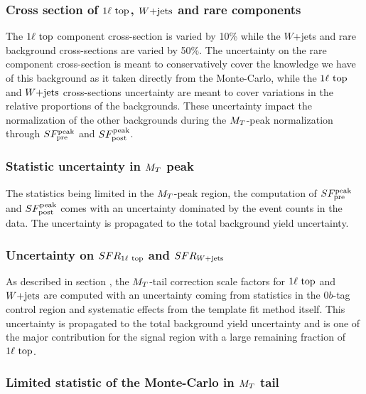             \subsubsection{Cross section of $1\ell~\text{top}$, $\text{$W$+jets}$ and rare components}
        
            The $1\ell~\text{top}$ component cross-section is varied by 10\% while the $W$+jets 
            and rare background cross-sections are varied by 50\%. The uncertainty on the rare 
            component cross-section is meant to conservatively cover the knowledge we have of 
            this background as it taken directly from the Monte-Carlo, while the $1\ell~\text{top}$ and 
            $\text{$W$+jets}$ cross-sections uncertainty are meant to cover variations in the relative 
            proportions of the backgrounds. These uncertainty impact the normalization of the 
            other backgrounds during the $M_T$-peak normalization through $SF_{\text{pre}}^{\text{peak}}$ and $SF_{\text{post}}^{\text{peak}}$.

            \subsubsection{Statistic uncertainty in $M_T$ peak}
            
            The statistics being limited in the $M_T$-peak region, the computation of 
            $SF_{\text{pre}}^{\text{peak}}$ and $SF_{\text{post}}^{\text{peak}}$ comes with an uncertainty dominated by the event counts 
            in the data. The uncertainty is propagated to the total background yield uncertainty.

            \subsubsection{Uncertainty on $SFR_{1\ell~\text{top}}$ and $SFR_{\text{$W$+jets}}$}

            As described in section \label{sec:MTtailCorrection}, the $M_T$-tail correction
            scale factors for $1\ell~\text{top}$ and $\text{$W$+jets}$ are computed with an uncertainty
            coming from statistics in the $0b$-tag control region and systematic effects
            from the template fit method itself. This uncertainty is propagated to the total
            background yield uncertainty and is one of the major contribution for the signal
            region with a large remaining fraction of $1\ell~\text{top}$.

            \subsubsection{Limited statistic of the Monte-Carlo in $M_T$ tail}
            
